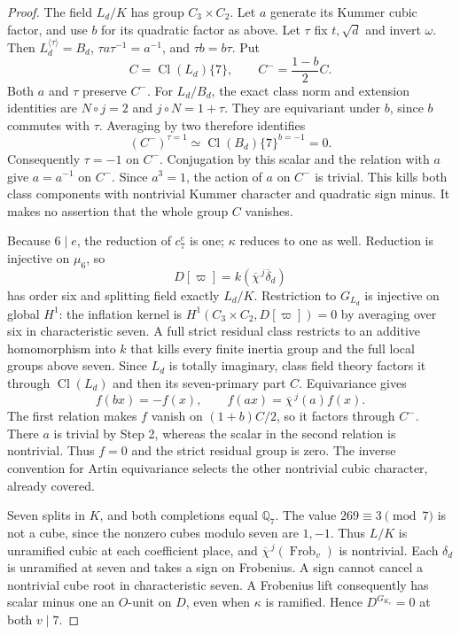 \begin{proof}
The field $L_d/K$ has group $C_3\times C_2$.
Let $a$ generate its Kummer cubic factor, and use $b$ for
its quadratic factor as above.  Let $\tau$ fix $t,\sqrt d$
and invert $\omega$.  Then $L_d^{\langle\tau\rangle}=B_d$,
$\tau a\tau^{-1}=a^{-1}$, and $\tau b=b\tau$.
Put
\[
           C=\operatorname{Cl}(L_d)\{7\},
           \qquad C^-=\frac{1-b}{2}C.
 \tag{MQ7.14}
\]
Both $a$ and $\tau$ preserve $C^-$.
For $L_d/B_d$, the exact class norm and extension identities
are $N\circ j=2$ and $j\circ N=1+\tau$.
They are equivariant under $b$, since $b$ commutes with
$\tau$.  Averaging by two therefore identifies
\[
          (C^-)^{\tau=1}
              \simeq\operatorname{Cl}(B_d)\{7\}^{b=-1}=0.
 \tag{MQ7.15}
\]
Consequently $\tau=-1$ on $C^-$.
Conjugation by this scalar and the relation with $a$ give
$a=a^{-1}$ on $C^-$.  Since $a^3=1$, the action of $a$
on $C^-$ is trivial.  This kills both class components
with nontrivial Kummer character and quadratic sign minus.
It makes no assertion that the whole group $C$ vanishes.

Because $6\mid e$, the reduction of $c_7^e$ is one;
$\kappa$ reduces to one as well.  Reduction is injective
on $\mu_6$, so
\[
                  D[\varpi]=k(\overline\chi^{\,j}\overline\delta_d)
 \tag{MQ7.16}
\]
has order six and splitting field exactly $L_d/K$.
Restriction to $G_{L_d}$ is injective on global $H^1$:
the inflation kernel is $H^1(C_3\times C_2,D[\varpi])=0$
by averaging over six in characteristic seven.
A full strict residual class restricts to an additive
homomorphism into $k$ that kills every finite inertia group
and the full local groups above seven.  Since $L_d$ is
totally imaginary, class field theory factors it through
$\operatorname{Cl}(L_d)$ and then its seven-primary part $C$.
Equivariance gives
\[
                f(bx)=-f(x),\qquad
                f(ax)=\overline\chi^{\,j}(a)f(x).
 \tag{MQ7.17}
\]
The first relation makes $f$ vanish on $(1+b)C/2$, so it
factors through $C^-$.  There $a$ is trivial by Step 2,
whereas the scalar in the second relation is nontrivial.
Thus $f=0$ and the strict residual group is zero.
The inverse convention for Artin equivariance selects the
other nontrivial cubic character, already covered.

Seven splits in $K$, and both completions equal $\mathbb Q_7$.
The value $269\equiv3\pmod7$ is not a cube, since the
nonzero cubes modulo seven are $1,-1$.
Thus $L/K$ is unramified cubic at each coefficient place,
and $\overline\chi^{\,j}(\operatorname{Frob}_v)$ is nontrivial.
Each $\delta_d$ is unramified at seven and takes a sign on
Frobenius.  A sign cannot cancel a nontrivial cube root in
characteristic seven.  A Frobenius lift consequently has
scalar minus one an $O$-unit on $D$, even when $\kappa$ is
ramified.  Hence $D^{G_{K_v}}=0$ at both $v\mid7$.


\end{proof}
